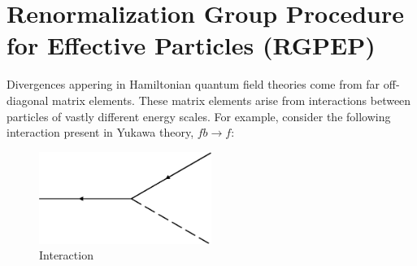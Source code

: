 \section{Renormalization Group Procedure for Effective Particles (RGPEP)}
\label{sec:rgpep}

Divergences appering in Hamiltonian quantum field theories come from far off-diagonal matrix elements. 
These matrix elements arise from interactions between particles of vastly different energy scales. 
For example, consider the following interaction present in Yukawa theory, $fb \rightarrow f$:
\begin{figure}[h]
    \label{fig:interaction}
    \includegraphics[width = 0.5\textwidth, height = 0.25\textwidth]{figures/interaction.pdf}
    \caption{Interaction}
\end{figure}

